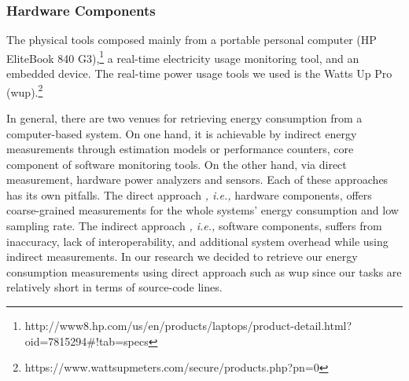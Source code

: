 

\subsubsection{Hardware Components}
The physical tools composed mainly from a portable personal 
computer (HP EliteBook 840 G3),\footnote{http://www8.hp.com/us/en/products/laptops/product-detail.html?oid=7815294\#!tab=specs} 
a real-time electricity usage monitoring tool, and 
an embedded device.
The real-time power usage tools we used is the Watts Up 
Pro ({\sc wup}).\footnote{https://www.wattsupmeters.com/secure/products.php?pn=0} 

In general, there are two venues for retrieving energy consumption 
from a computer-based system. 
On one hand, it is achievable by indirect energy measurements 
through estimation models or performance counters, core component 
of software monitoring tools. 
On the other hand, via direct measurement, hardware power analyzers 
and sensors.  
Each of these approaches has its own pitfalls. The direct approach 
\textit{, i.e.,} hardware components,  offers coarse-grained 
measurements for the whole systems' energy consumption and low sampling 
rate. 
The indirect approach \textit{, i.e.,} software components, suffers 
from inaccuracy, lack of interoperability, and additional system 
overhead while using indirect measurements. 
In our research we decided to retrieve our energy consumption 
measurements using direct approach such as {\sc wup} since our 
tasks are relatively short in terms of source-code lines.

